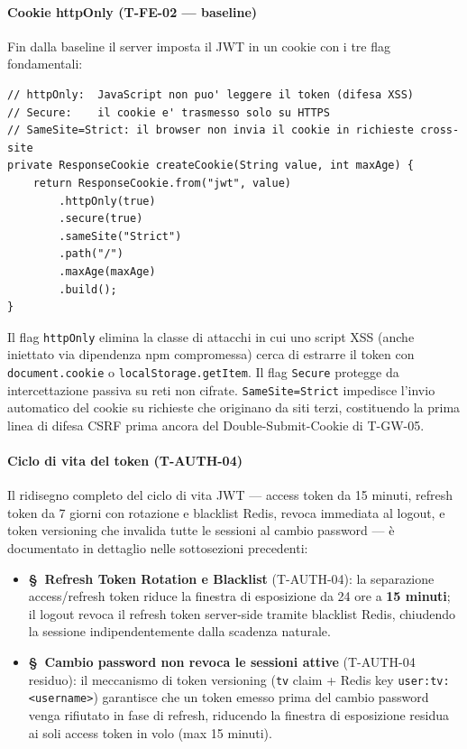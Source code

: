 ﻿\documentclass[a4paper,12pt]{report}
\begin{document}
\paragraph{Cookie httpOnly (T-FE-02 — baseline)}
Fin dalla baseline il server imposta il JWT in un cookie con i tre flag
fondamentali:

\begin{securebox}[title={Cookie JWT --- AuthController.java (branch \texttt{main})}]
\begin{lstlisting}[style=java]
// httpOnly:  JavaScript non puo' leggere il token (difesa XSS)
// Secure:    il cookie e' trasmesso solo su HTTPS
// SameSite=Strict: il browser non invia il cookie in richieste cross-site
private ResponseCookie createCookie(String value, int maxAge) {
    return ResponseCookie.from("jwt", value)
        .httpOnly(true)
        .secure(true)
        .sameSite("Strict")
        .path("/")
        .maxAge(maxAge)
        .build();
}
\end{lstlisting}
\end{securebox}

Il flag \texttt{httpOnly} elimina la classe di attacchi in cui uno script
XSS (anche iniettato via dipendenza npm compromessa) cerca di estrarre il
token con \texttt{document.cookie} o \texttt{localStorage.getItem}.
Il flag \texttt{Secure} protegge da intercettazione passiva su reti non
cifrate. \texttt{SameSite=Strict} impedisce l'invio automatico del cookie su
richieste che originano da siti terzi, costituendo la prima linea di difesa
CSRF prima ancora del Double-Submit-Cookie di T-GW-05.

\paragraph{Ciclo di vita del token (T-AUTH-04)}
Il ridisegno completo del ciclo di vita JWT --- access token da 15 minuti,
refresh token da 7 giorni con rotazione e blacklist Redis, revoca immediata
al logout, e token versioning che invalida tutte le sessioni al cambio password
--- è documentato in dettaglio nelle sottosezioni precedenti:

\begin{itemize}
  \item \textbf{\S~Refresh Token Rotation e Blacklist} (T-AUTH-04): la separazione
        access/refresh token riduce la finestra di esposizione da 24 ore a
        \textbf{15 minuti}; il logout revoca il refresh token server-side tramite
        blacklist Redis, chiudendo la sessione indipendentemente dalla scadenza
        naturale.
  \item \textbf{\S~Cambio password non revoca le sessioni attive} (T-AUTH-04 residuo):
        il meccanismo di token versioning (\texttt{tv} claim + Redis key
        \texttt{user:tv:<username>}) garantisce che un token emesso prima del
        cambio password venga rifiutato in fase di refresh, riducendo la finestra
        di esposizione residua ai soli access token in volo (max 15 minuti).
\end{itemize}
\end{document}

